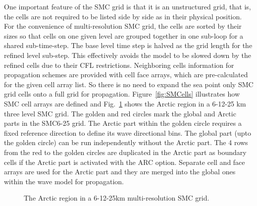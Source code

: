 One important feature of the SMC grid is that it is an unstructured grid, that
is, the cells are not required to be listed side by side as in their physical
position. For the convenience of multi-resolution SMC grid, the cells are
sorted by their sizes so that cells on one given level are grouped together in
one sub-loop for a shared sub-time-step.  The base level time step is halved
as the grid length for the refined level sub-step. This effectively avoids the
model to be slowed down by the refined cells due to their CFL restrictions. 
Neighboring cells information for propagation schemes are provided with cell 
face arrays, which are pre-calculated for the given cell array list. So there 
is no need to expand the sea point only SMC grid cells onto a full grid for 
propagation. Figure~\ref{fig:SMCells} illustrates how SMC cell arrays are 
defined and Fig.~\ref{fig:SMC_Arctic} shows the Arctic region in a 6-12-25 km 
three level SMC grid. The golden and red circles mark the global and Arctic 
parts in the SMC6-25 grid. The Arctic part within the golden circle requires a 
fixed reference direction to define its wave directional bins. The global part 
(upto the golden circle) can be run independently without the Arctic part. 
The 4 rows from the red to the golden circles are duplicated in the Arctic part 
as boundary cells if the Arctic part is activated with the ARC option.  
Separate cell and face arrays are used for the Arctic part and they are merged 
into the global ones within the wave model for propagation.

\begin{figure}
\centerline{}
\caption{The Arctic region in a 6-12-25km multi-resolution SMC grid.}
\label{fig:SMC_Arctic} 
\botline
\end{figure}


